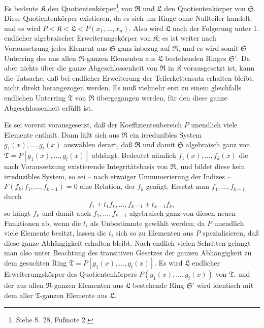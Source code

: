 \documentclass[11pt]{article}
\begin{document}
Es bedeute $\mathfrak K$ den Quotientenkörper\footnote{Siehe S. 28, Fußnote 2.} von $\mathfrak R$ und $\mathfrak L$ den Quotientenkörper von $\mathfrak S$. Diese Quotientenkörper existieren, da es sich um Ringe ohne Nullteiler handelt; und es wird $P<\mathfrak K<\mathfrak L<P(x_1,\ldots,x_n)$. Also wird $\mathfrak L$ nach der Folgerung unter 1. endlicher algebraischer Erweiterungskörper von $\mathfrak K$; es ist weiter nach Voraussetzung jedes Element aus $\mathfrak S$ ganz inbezug auf $\mathfrak R$, und es wird somit $\mathfrak S$ Unterring des aus allen $\mathfrak R$-ganzen Elementen aus $\mathfrak L$ bestehenden Ringes $\mathfrak S'$. Da aber nichts über die ganze Abgeschlossenheit von $\mathfrak R$ in $\mathfrak K$ vorausgesetzt ist, kann die Tatsache, daß bei endlicher Erweiterung der Teilerkettensatz erhalten bleibt, nicht direkt herangezogen werden. Es muß vielmehr erst zu einem gleichfalls endlichen Unterring $\mathfrak T$ von $\mathfrak R$ übergegangen werden, für den diese ganze Abgeschlossenheit erfüllt ist.

Es sei vorerst vorausgesetzt, daß der Koeffizientenbereich $P$ unendlich viele Elemente enthält. Dann läßt sich aus $\mathfrak R$ ein irreduzibles System $g_1(x),\ldots,g_t(x)$ auswählen derart, daß $\mathfrak R$ und damit $\mathfrak S$ algebraisch ganz von $\mathfrak T=P[g_1(x),\ldots,g_t(x)]$ abhängt. Bedeutet nämlich $f_1(x),\ldots,f_k(x)$ die nach Voraussetzung existierende Integritätsbasis von $\mathfrak R$, und bildet diese kein irreduzibles System, so sei -- nach etwaiger Umnumerierung der Indizes -- $F(f_k;f_1,\ldots,f_{k-1})=0$ eine Relation, der $f_k$ genügt. Ersetzt man $f_1,\ldots,f_{k-1}$ durch
\[
 f_1+t_1f_k,\ldots,f_{k-1}+t_{k-1}f_k,
\]
so hängt $f_k$ und damit auch $f_1,\ldots,f_{k-1}$ algebraisch ganz von diesen neuen Funktionen ab, wenn die $t_i$ als Unbestimmte gewählt werden; da $P$ unendlich viele Elemente besitzt, lassen die $t_i$ sich so zu Elementen aus $P$ spezialisieren, daß diese ganze Abhängigkeit erhalten bleibt. Nach endlich vielen Schritten gelangt man also unter Beachtung des transitiven Gesetzes der ganzen Abhängigkeit zu dem gesuchten Ring $\mathfrak T=P[g_1(x),\ldots,g_t(x)]$. Es wird $\mathfrak L$ endlicher Erweiterungskörper des Quotientenkörpers $P(g_1(x),\ldots,g_t(x))$ von $\mathfrak T$, und der aus allen $\mathfrak R$-ganzen Elementen aus $\mathfrak L$ bestehende Ring $\mathfrak S'$ wird identisch mit dem aller $\mathfrak T$-ganzen Elemente aus $\mathfrak L$.
\end{document}
